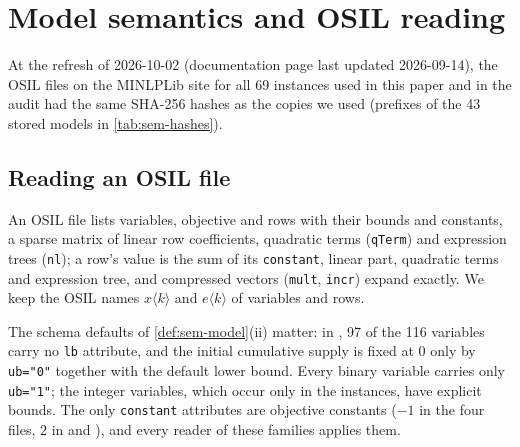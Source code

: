 \section{Model semantics and OSIL reading}\label{app:semantics}

At the refresh of 2026-10-02 (documentation page last updated 2026-09-14), the OSIL files on the MINLPLib site for all 69 instances used in this paper and in the audit had the same SHA-256 hashes as the copies we used (prefixes of the 43 stored models in \cref{tab:sem-hashes}).

\subsection{Reading an OSIL file}\label{app:semantics-osil}

An OSIL file lists variables, objective and rows with their bounds and constants, a sparse matrix of linear row coefficients, quadratic terms (\texttt{qTerm}) and expression trees (\texttt{nl}); a row's value is the sum of its \texttt{constant}, linear part, quadratic terms and expression tree, and compressed vectors (\texttt{mult}, \texttt{incr}) expand exactly.
We keep the OSIL names $x\langle k\rangle$ and $e\langle k\rangle$ of variables and rows.

The schema defaults of \cref{def:sem-model}(ii) matter: in , 97 of the 116 variables carry no \texttt{lb} attribute, and the initial cumulative supply is fixed at $0$ only by \texttt{ub="0"} together with the default lower bound.
Every binary variable carries only \texttt{ub="1"}; the integer variables, which occur only in the  instances, have explicit bounds.
The only \texttt{constant} attributes are objective constants ($-1$ in the four  files, $2$ in  and ), and every reader of these families applies them.

